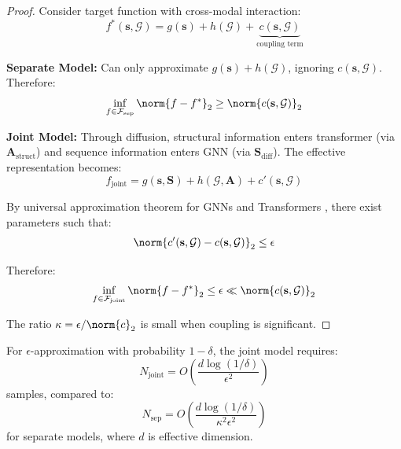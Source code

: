 \documentclass[12pt,en]{elegantpaper}
\begin{document}
\begin{proof}
Consider target function with cross-modal interaction:
\begin{equation}
    f^*(\mathbf{s}, \mathcal{G}) = g(\mathbf{s}) + h(\mathcal{G}) + \underbrace{c(\mathbf{s}, \mathcal{G})}_{\text{coupling term}}
\end{equation}

\textbf{Separate Model:} Can only approximate $g(\mathbf{s}) + h(\mathcal{G})$, ignoring $c(\mathbf{s}, \mathcal{G})$. Therefore:
\begin{equation}
    \inf_{f \in \mathcal{F}_{\text{sep}}} \norm{f - f^*}_2 \geq \norm{c(\mathbf{s}, \mathcal{G})}_2
\end{equation}

\textbf{Joint Model:} Through diffusion, structural information enters transformer (via $\mathbf{A}_{\text{struct}}$) and sequence information enters GNN (via $\mathbf{S}_{\text{diff}}$). The effective representation becomes:
\begin{equation}
    f_{\text{joint}} = g(\mathbf{s}, \mathbf{S}) + h(\mathcal{G}, \mathbf{A}) + c'(\mathbf{s}, \mathcal{G})
\end{equation}

By universal approximation theorem for GNNs \citep{xu2019powerful} and Transformers \citep{yun2020transformers}, there exist parameters such that:
\begin{equation}
    \norm{c'(\mathbf{s}, \mathcal{G}) - c(\mathbf{s}, \mathcal{G})}_2 \leq \epsilon
\end{equation}

Therefore:
\begin{equation}
    \inf_{f \in \mathcal{F}_{\text{joint}}} \norm{f - f^*}_2 \leq \epsilon \ll \norm{c(\mathbf{s}, \mathcal{G})}_2
\end{equation}

The ratio $\kappa = \epsilon / \norm{c}_2$ is small when coupling is significant.
\end{proof}

\begin{corollary}
For $\epsilon$-approximation with probability $1-\delta$, the joint model requires:
\begin{equation}
    N_{\text{joint}} = O\left(\frac{d \log(1/\delta)}{\epsilon^2}\right)
\end{equation}
samples, compared to:
\begin{equation}
    N_{\text{sep}} = O\left(\frac{d \log(1/\delta)}{\kappa^2 \epsilon^2}\right)
\end{equation}
for separate models, where $d$ is effective dimension.
\end{corollary}
\end{document}
